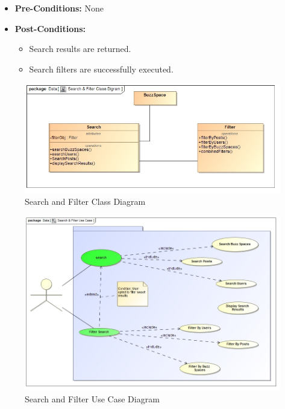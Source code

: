 \documentclass[11pt]{article}
\begin{document}
\begin{enumerate}
\begin{itemize}
 
	\item\textbf{Pre-Conditions:} None
	\item\textbf{Post-Conditions: }
	    \begin{itemize}
		\item Search results are returned.
	  	\item Search filters are successfully executed.
	     \end{itemize}
  \end{itemize}
	\graphicspath{ {../Diagrams/Sphe/Search&Filter/} }
		 \begin{figure}[H]	
	 		\includegraphics[scale=0.65]{ClassDiagram.jpg}
    			\caption{Search and Filter Class Diagram}
		\end{figure}
	\graphicspath{ {../Diagrams/Sphe/Search&Filter/} }
		\begin{figure}[H]	
    			\includegraphics[scale=0.5]{UseCase.jpg}
    			\caption{Search and Filter Use Case Diagram}
		\end{figure}
	

\end{enumerate}
\end{document}
